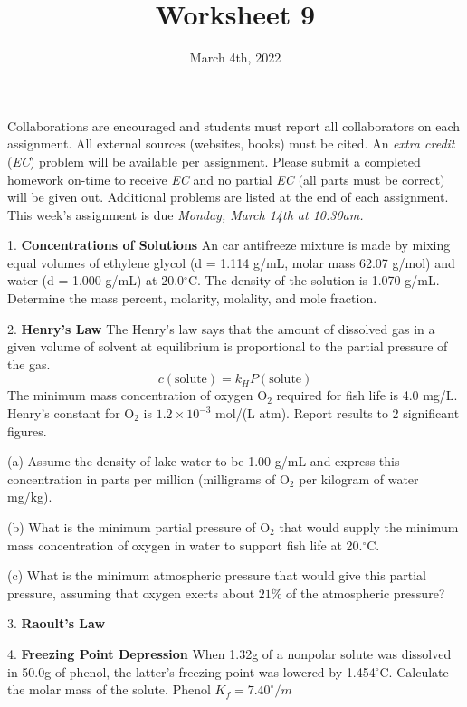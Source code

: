 \documentclass[11pt]{article}
\title{\textbf{Worksheet 9}}
\date{\vspace{-2em}March 4th, 2022}
\begin{document}
\maketitle

Collaborations are encouraged and students must report all collaborators
on each assignment. All external sources (websites, books) must be
cited. An \textit{extra credit} (\textit{EC}) problem will be available per
assignment. Please submit a completed homework on-time to receive \textit{EC}
and no partial \textit{EC} (all parts must be correct) will be given out.
Additional problems are listed at the end of each assignment. This week's
assignment is due \textit{Monday, March 14th at 10:30am.}

1. \textbf{Concentrations of Solutions} An car antifreeze mixture is made by mixing
equal volumes of ethylene glycol (d = 1.114 g/mL, molar mass 62.07 g/mol) and water
(d = 1.000 g/mL) at 20.0$^\circ$C. The density of the solution is 1.070 g/mL. Determine
the mass percent, molarity, molality, and mole fraction.


2. \textbf{Henry's Law} The Henry's law says that the amount of dissolved gas in
a given volume of solvent at equilibrium is proportional to the partial pressure of
the gas. 
\begin{equation}
  c(\text{solute}) = k_HP(\text{solute})
\end{equation}
The minimum mass concentration of oxygen O$_2$ required for fish life is 4.0 mg/L.
Henry's constant for O$_2$ is $1.2\times 10^{-3}$ mol/(L atm). Report results to 2
significant figures.

(a) Assume the density of lake water to be 1.00 g/mL and express this concentration
in parts per million (milligrams of O$_2$ per kilogram of water mg/kg).

(b) What is the minimum partial pressure of O$_2$ that would supply the minimum mass
concentration of oxygen in water to support fish life at 20.$^\circ$C.

(c) What is the minimum atmospheric pressure that would give this partial pressure,
assuming that oxygen exerts about $21\%$ of the atmospheric pressure?


3. \textbf{Raoult's Law} 

4. \textbf{Freezing Point Depression} When 1.32g of a nonpolar solute was dissolved in
50.0g of phenol, the latter's freezing point was lowered by 1.454$^\circ$C. Calculate
the molar mass of the solute. Phenol $K_f = 7.40^\circ/m$
\end{document}
